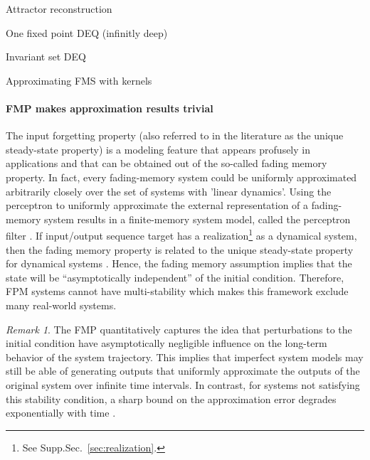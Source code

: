 \documentclass{article}
\theoremstyle{definition}
\theoremstyle{remark}
\newtheorem{remark}{Remark}
\newcounter{ct}
\begin{document}

Attractor reconstruction \citep{hart2024attractor}

One fixed point \citep{bai2019deq} DEQ (infinitly deep)

Invariant set \citep{konishi2023stable} DEQ

Approximating FMS with kernels \citep{huo2024kernel}

\paragraph{FMP makes approximation results trivial} %
 The input forgetting property (also referred to in the literature as the unique steady-state property) is a modeling feature that appears profusely in applications and that can be obtained out of the so-called fading memory property.
In fact, every fading-memory system could be uniformly approximated arbitrarily closely over the set of systems with 'linear dynamics'\citep{matthews1993approximating}. %
Using the perceptron to uniformly approximate the external representation of a fading-memory system results in a finite-memory system model, called the perceptron filter \citep{matthews1993approximating}.
%
If  input/output sequence target has a realization\footnote{See Supp.Sec.~\ref{sec:realization}.} as a dynamical system, then the fading memory property is related to the unique steady-state property for dynamical systems \citep{chua1976qualitative}.
Hence, the fading memory assumption implies that the state will be “asymptotically independent” of the initial condition.
Therefore, FPM systems cannot have multi-stability which makes this framework exclude many real-world systems.

 
\begin{remark}
The FMP quantitatively captures the idea that perturbations to the initial condition have asymptotically negligible influence on the long-term behavior of the system trajectory.
This implies that imperfect system models may still be able of generating outputs that uniformly approximate the outputs of the original system over infinite time intervals.
In contrast, for systems not satisfying this stability condition, a sharp bound on the approximation error degrades exponentially with time \citep{hirsch1974nonautonomous, sontag2013mathematical}.
\end{remark}
\end{document}
